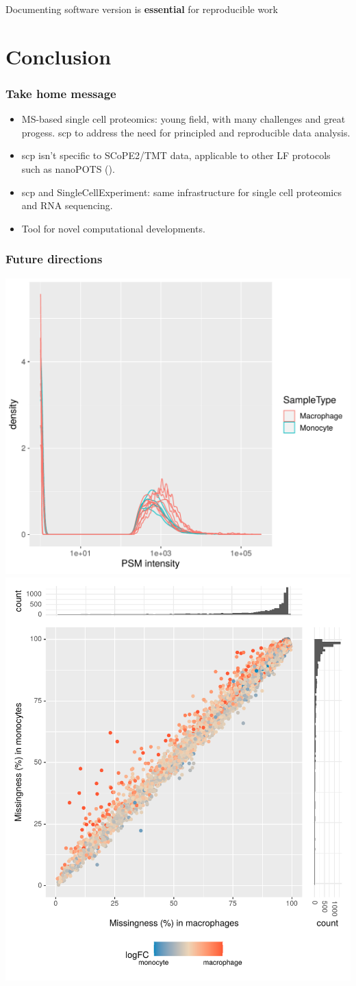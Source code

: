 \documentclass{beamer}
\newcommand{\hcode}[2][lgray]{{\ttfamily\color{vdgray}\colorbox{#1}{#2}}}
\newcommand{\frametitlesection}[1]{\frametitle{\centering #1 \footnotesize \hspace{0pt plus 1 filll} \insertsection}}
\begin{document}
\begin{frame}
    \bigskip
    
    Documenting software version is \textbf{essential} for reproducible work

\end{frame}



\section{Conclusion}


\begin{frame}
  \frametitlesection{Take home message}  
  \begin{itemize}
  \item MS-based single cell proteomics: young field, with many
    challenges and great progess. \hcode{scp} to address the need for
    principled and reproducible data analysis.
  \item \hcode{scp} isn't specific to SCoPE2/TMT data, applicable to
    other LF protocols such as nanoPOTS (\citet{Williams2020-nv,Cong2020-kh}).
  \item \hcode{scp} and \hcode{SingleCellExperiment}: same
    infrastructure for single cell proteomics and RNA sequencing.
  \item Tool for novel computational developments.
    
  \end{itemize}
\end{frame}

\begin{frame}
    \frametitlesection{Future directions}
    \includegraphics[width=.5\linewidth]{figs/PSM_intensity.pdf}
    \includegraphics[width=.4\linewidth]{figs/missingness.pdf}

\end{frame}
\end{document}
